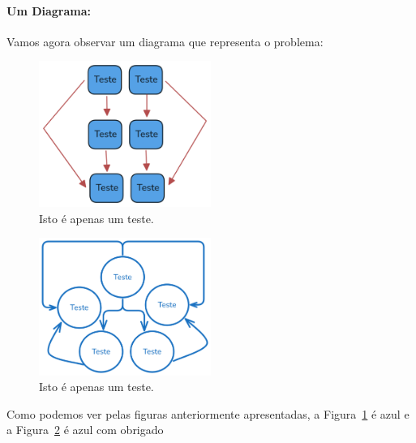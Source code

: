 \paragraph{Um Diagrama:} Vamos agora observar um diagrama que representa o problema:

\begin{figure}[htb!]
    \centering
    \includegraphics[width=0.5\textwidth]{figures/teste}
    \caption{Isto é apenas um teste.}
    \label{fig:teste}
\end{figure}

\begin{figure}[htb!]
    \centering
    \includegraphics[width=0.5\textwidth]{figures/diagrama}
    \caption{Isto é apenas um teste.}
    \label{fig:diagrama}
\end{figure}

Como podemos ver pelas figuras anteriormente apresentadas, a Figura~\ref{fig:teste} é azul e a Figura~\ref{fig:diagrama} é azul com obrigado